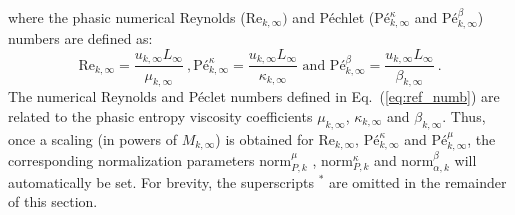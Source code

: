 \documentclass[preprint,10pt]{elsarticle}
\newcommand{\norm}{\textrm{norm}}
\renewcommand{\Re}{\textrm{Re}}
\newcommand{\Pe}{\textrm{P\'e}}
\newcommand{\eqt}[1]{Eq.~(\ref{#1})}                     %
\begin{document}
%
where the phasic numerical Reynolds ($\Re_{k,\infty})$ and P\'echlet ($\Pe_{k,\infty}^\kappa$ and $\Pe_{k,\infty}^\beta$) numbers are defined as:
%
\begin{equation}
\label{eq:ref_numb}
\Re_{k,\infty} = \frac{u_{k,\infty} L_\infty}{\mu_{k,\infty}} \ ,
\Pe_{k,\infty}^\kappa = \frac{u_{k,\infty} L_\infty}{\kappa_{k,\infty}} \text{ and }
\Pe_{k,\infty}^\beta = \frac{u_{k,\infty} L_\infty}{\beta_{k,\infty}} \ .
\end{equation}
%
The numerical Reynolds and P\'eclet numbers defined in \eqt{eq:ref_numb} are related to the phasic entropy 
viscosity coefficients $\mu_{k,\infty}$, $\kappa_{k,\infty}$ and $\beta_{k,\infty}$. Thus, once a scaling (in powers of $M_{k,\infty}$) 
is obtained for $\Re_{k,\infty}$, $\Pe_{k,\infty}^\kappa$ and $\Pe_{k,\infty}^\mu$, the corresponding normalization parameters $\norm_{P,k}^\mu$ 
, $\norm_{P,k}^\kappa$ and $\norm_{\alpha,k}^\beta$ will automatically be set. For brevity, the superscripts $^*$ are omitted in the remainder of this section.  
\end{document}

